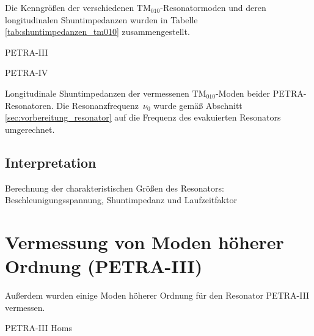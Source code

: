 Die Kenngrößen der verschiedenen $\mathrm{TM}_{010}$-Resonatormoden und deren longitudinalen Shuntimpedanzen wurden in Tabelle \ref{tab:shuntimpedanzen_tm010} zusammengestellt.
\begin{table}[htb]
	\begin{subtable}{1\textwidth}
		\centering
		
		\caption{PETRA-III}
	\end{subtable}
	\begin{subtable}{1\textwidth}
		\centering
		
		\caption{PETRA-IV}
	\end{subtable}
	\caption{Longitudinale Shuntimpedanzen der vermessenen $\mathrm{TM}_{010}$-Moden beider PETRA-Resonatoren. Die Resonanzfrequenz~$\nu_0$ wurde gemäß Abschnitt \ref{sec:vorbereitung_resonator} auf die Frequenz des evakuierten Resonators umgerechnet.}
	\label{tab:shuntimpedanzen_tm010}
\end{table}

\subsection{Interpretation}
Berechnung der charakteristischen Größen des Resonators: Beschleunigungsspannung, Shuntimpedanz und Laufzeitfaktor




\section{Vermessung von Moden höherer Ordnung (PETRA-III)}
\label{sec:hom_messung}
Außerdem wurden einige Moden höherer Ordnung für den Resonator PETRA-III vermessen.

\begin{table}[htb]
	\centering
	
	\caption{PETRA-III Homs}
\end{table}


